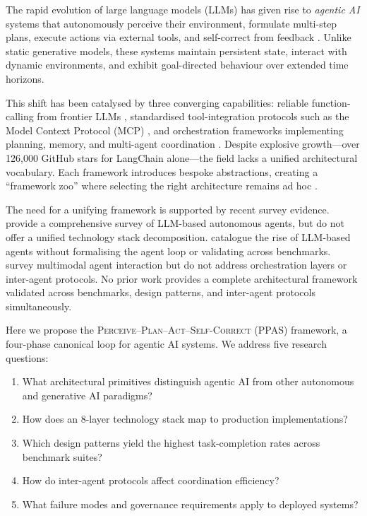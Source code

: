 \documentclass[review,authoryear]{elsarticle}
\theoremstyle{definition}
\begin{document}
The rapid evolution of large language models (LLMs) has given rise to \emph{agentic AI} systems that autonomously perceive their environment, formulate multi-step plans, execute actions via external tools, and self-correct from feedback \citep{yao2023react,shinn2023reflexion,wang2024survey}. Unlike static generative models, these systems maintain persistent state, interact with dynamic environments, and exhibit goal-directed behaviour over extended time horizons.

This shift has been catalysed by three converging capabilities: reliable function-calling from frontier LLMs \citep{openai2024gpt4o,anthropic2024claude}, standardised tool-integration protocols such as the Model Context Protocol (MCP) \citep{anthropic2024mcp}, and orchestration frameworks implementing planning, memory, and multi-agent coordination \citep{langchain2024langgraph,wu2023autogen}. Despite explosive growth---over 126,000 GitHub stars for LangChain alone---the field lacks a unified architectural vocabulary. Each framework introduces bespoke abstractions, creating a ``framework zoo'' where selecting the right architecture remains ad hoc \citep{masterman2024landscape}.

The need for a unifying framework is supported by recent survey evidence. \citet{wang2024survey} provide a comprehensive survey of LLM-based autonomous agents, but do not offer a unified technology stack decomposition. \citet{xi2023rise} catalogue the rise of LLM-based agents without formalising the agent loop or validating across benchmarks. \citet{durante2024agent} survey multimodal agent interaction but do not address orchestration layers or inter-agent protocols. No prior work provides a complete architectural framework validated across benchmarks, design patterns, and inter-agent protocols simultaneously.

Here we propose the \textsc{Perceive--Plan--Act--Self-Correct} (PPAS) framework, a four-phase canonical loop for agentic AI systems. We address five research questions:

\begin{enumerate}
    \item[\textbf{RQ1.}] What architectural primitives distinguish agentic AI from other autonomous and generative AI paradigms?
    \item[\textbf{RQ2.}] How does an 8-layer technology stack map to production implementations?
    \item[\textbf{RQ3.}] Which design patterns yield the highest task-completion rates across benchmark suites?
    \item[\textbf{RQ4.}] How do inter-agent protocols affect coordination efficiency?
    \item[\textbf{RQ5.}] What failure modes and governance requirements apply to deployed systems?
\end{enumerate}
\end{document}
